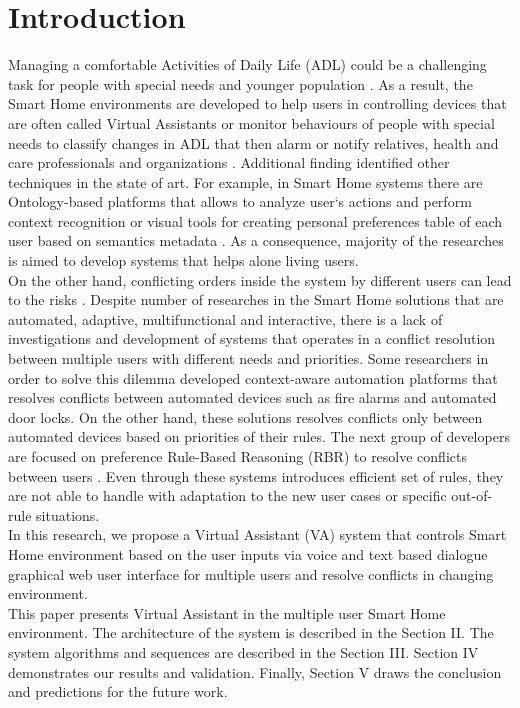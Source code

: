 \documentclass{llncs}
\begin{document}
    \section{Introduction}
    Managing a comfortable Activities of Daily Life (ADL) could be a challenging task for people with special needs
    and younger population \cite{9}.
    As a result,
    the Smart Home environments are developed to help users in controlling devices \cite{13}
    that are often called Virtual Assistants \cite{9} or monitor behaviours of people
    with special needs \cite{3} to classify changes in ADL that then alarm or notify relatives, health and care professionals
    and organizations \cite{15}.
    Additional finding identified other techniques in the state of art.
    For example, in Smart Home systems there are Ontology-based platforms that allows to analyze user`s actions and
    perform context recognition \cite{1} or visual tools for creating personal preferences table of each user based on semantics
    metadata \cite{8}.
    As a consequence, majority of the researches is aimed to develop systems that helps alone living users.\\
    On the other hand, conflicting orders inside the system by different users can lead to the risks \cite{5}.
    Despite number of
    researches in the Smart Home solutions that are automated, adaptive, multifunctional and interactive, there is a lack of
    investigations and development of systems that operates in a conflict resolution between multiple users with different
    needs and priorities.
    Some researchers in order to solve this dilemma developed context-aware automation platforms
    \cite{5,6} that resolves conflicts between automated devices such as fire alarms and automated door locks.
    On the other hand, these solutions resolves conflicts only between automated devices based on priorities of their rules.
    The next group of
    developers are focused on preference Rule-Based Reasoning (RBR) to resolve conflicts between users \cite{9}. Even through
    these systems introduces efficient set of rules, they are not able to handle with adaptation to the new user cases or
    specific out-of-rule situations. \\
    In this research, we propose a Virtual Assistant (VA) system that controls Smart Home environment based on the user inputs via
    voice and text based dialogue graphical web user interface for multiple users and resolve conflicts in changing environment.\\
    This paper presents Virtual Assistant in the multiple user Smart Home environment.
    The architecture of the system is
    described in the Section II. The system algorithms and sequences are described in the Section III. Section IV demonstrates
    our results and validation.
    Finally, Section V draws the conclusion and predictions for the future work.
\end{document}
